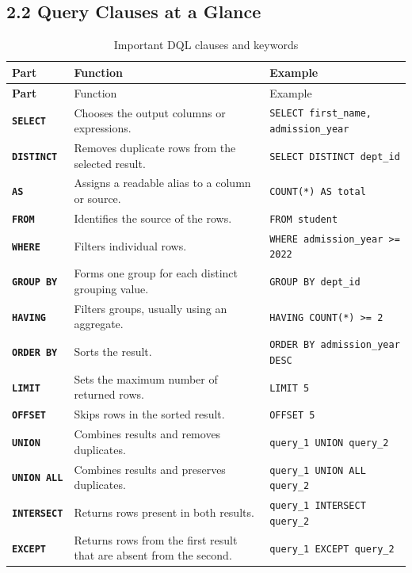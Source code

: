 \documentclass[12pt,a4paper]{article}
\begin{document}
\subsection*{2.2 Query Clauses at a Glance}
\begingroup
{}
\small
\renewcommand{\arraystretch}{1.25}
\begin{longtable}{>{\bfseries}p{2.5cm} p{4.2cm} p{5.8cm}}
\caption{Important DQL clauses and keywords}
\label{tab:dql_clauses}\\
\toprule
Part & Function & Example \\
\midrule
\endfirsthead
\toprule
Part & Function & Example \\
\midrule
\endhead
\bottomrule
\endfoot
\texttt{SELECT} & Chooses the output columns or expressions. &
\texttt{SELECT first\_name, admission\_year} \\

\texttt{DISTINCT} & Removes duplicate rows from the selected result. &
\texttt{SELECT DISTINCT dept\_id} \\

\texttt{AS} & Assigns a readable alias to a column or source. &
\texttt{COUNT(*) AS total} \\

\texttt{FROM} & Identifies the source of the rows. &
\texttt{FROM student} \\

\texttt{WHERE} & Filters individual rows. &
\texttt{WHERE admission\_year >= 2022} \\

\texttt{GROUP BY} & Forms one group for each distinct grouping value. &
\texttt{GROUP BY dept\_id} \\

\texttt{HAVING} & Filters groups, usually using an aggregate. &
\texttt{HAVING COUNT(*) >= 2} \\

\texttt{ORDER BY} & Sorts the result. &
\texttt{ORDER BY admission\_year DESC} \\

\texttt{LIMIT} & Sets the maximum number of returned rows. &
\texttt{LIMIT 5} \\

\texttt{OFFSET} & Skips rows in the sorted result. &
\texttt{OFFSET 5} \\

\texttt{UNION} & Combines results and removes duplicates. &
\texttt{query\_1 UNION query\_2} \\

\texttt{UNION ALL} & Combines results and preserves duplicates. &
\texttt{query\_1 UNION ALL query\_2} \\

\texttt{INTERSECT} & Returns rows present in both results. &
\texttt{query\_1 INTERSECT query\_2} \\

\texttt{EXCEPT} & Returns rows from the first result that are absent from the second. &
\texttt{query\_1 EXCEPT query\_2} \\
\end{longtable}
\endgroup
\end{document}
